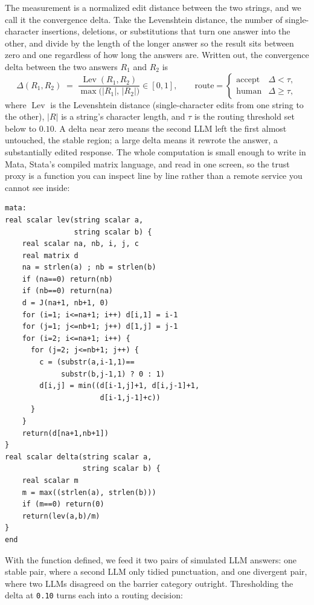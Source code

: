\documentclass[
    a4paper,
    fontsize=10pt,
    twoside=true,
    numbers=noenddot,
]{kaobook}
\begin{document}
The measurement is a normalized edit distance between the two strings, and we call it the convergence delta. Take the Levenshtein distance, the number of single-character insertions, deletions, or substitutions that turn one answer into the other, and divide by the length of the longer answer so the result sits between zero and one regardless of how long the answers are. Written out, the convergence delta between the two answers $R_1$ and $R_2$ is
\[
\Delta(R_1,R_2)
\;=\;
\frac{\operatorname{Lev}(R_1,R_2)}{\max\!\bigl(|R_1|,\,|R_2|\bigr)}
\in [0,1],
\qquad
\text{route} =
\begin{cases}
\text{accept} & \Delta < \tau,\\[2pt]
\text{human}  & \Delta \ge \tau,
\end{cases}
\]
where $\operatorname{Lev}$ is the Levenshtein distance (single-character edits from one string to the other), $|R|$ is a string's character length, and $\tau$ is the routing threshold set below to $0.10$. A delta near zero means the second LLM left the first almost untouched, the stable region; a large delta means it rewrote the answer, a substantially edited response. The whole computation is small enough to write in Mata, Stata's compiled matrix language, and read in one screen, so the trust proxy is a function you can inspect line by line rather than a remote service you cannot see inside:
\par
{\footnotesize
\begin{verbatim}
mata:
real scalar lev(string scalar a,
                string scalar b) {
    real scalar na, nb, i, j, c
    real matrix d
    na = strlen(a) ; nb = strlen(b)
    if (na==0) return(nb)
    if (nb==0) return(na)
    d = J(na+1, nb+1, 0)
    for (i=1; i<=na+1; i++) d[i,1] = i-1
    for (j=1; j<=nb+1; j++) d[1,j] = j-1
    for (i=2; i<=na+1; i++) {
      for (j=2; j<=nb+1; j++) {
        c = (substr(a,i-1,1)==
             substr(b,j-1,1) ? 0 : 1)
        d[i,j] = min((d[i-1,j]+1, d[i,j-1]+1,
                      d[i-1,j-1]+c))
      }
    }
    return(d[na+1,nb+1])
}
real scalar delta(string scalar a,
                  string scalar b) {
    real scalar m
    m = max((strlen(a), strlen(b)))
    if (m==0) return(0)
    return(lev(a,b)/m)
}
end
\end{verbatim}
}
With the function defined, we feed it two pairs of simulated LLM answers: one stable pair, where a second LLM only tidied punctuation, and one divergent pair, where two LLMs disagreed on the barrier category outright. Thresholding the delta at \texttt{0.10} turns each into a routing decision:
\end{document}
